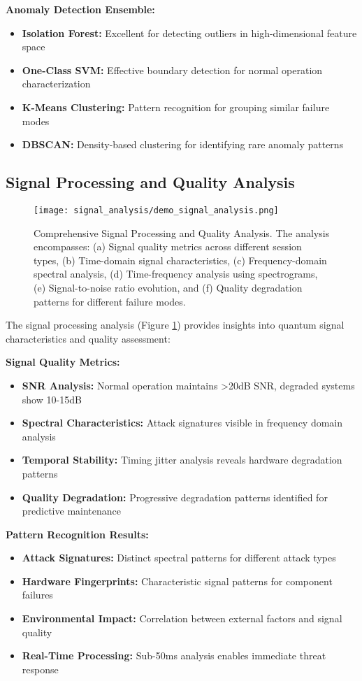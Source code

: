 \documentclass[12pt,a4paper]{article}
\begin{document}
\textbf{Anomaly Detection Ensemble:}
\begin{itemize}
    \item \textbf{Isolation Forest:} Excellent for detecting outliers in high-dimensional feature space
    \item \textbf{One-Class SVM:} Effective boundary detection for normal operation characterization
    \item \textbf{K-Means Clustering:} Pattern recognition for grouping similar failure modes
    \item \textbf{DBSCAN:} Density-based clustering for identifying rare anomaly patterns
\end{itemize}

\subsection{Signal Processing and Quality Analysis}

\begin{figure}[H]
\centering
\texttt{[image: signal\_analysis/demo\_signal\_analysis.png]}
\caption{Comprehensive Signal Processing and Quality Analysis. The analysis encompasses: (a) Signal quality metrics across different session types, (b) Time-domain signal characteristics, (c) Frequency-domain spectral analysis, (d) Time-frequency analysis using spectrograms, (e) Signal-to-noise ratio evolution, and (f) Quality degradation patterns for different failure modes.}
\label{fig:signal_analysis}
\end{figure}

The signal processing analysis (Figure \ref{fig:signal_analysis}) provides insights into quantum signal characteristics and quality assessment:

\textbf{Signal Quality Metrics:}
\begin{itemize}
    \item \textbf{SNR Analysis:} Normal operation maintains >20dB SNR, degraded systems show 10-15dB
    \item \textbf{Spectral Characteristics:} Attack signatures visible in frequency domain analysis
    \item \textbf{Temporal Stability:} Timing jitter analysis reveals hardware degradation patterns
    \item \textbf{Quality Degradation:} Progressive degradation patterns identified for predictive maintenance
\end{itemize}

\textbf{Pattern Recognition Results:}
\begin{itemize}
    \item \textbf{Attack Signatures:} Distinct spectral patterns for different attack types
    \item \textbf{Hardware Fingerprints:} Characteristic signal patterns for component failures
    \item \textbf{Environmental Impact:} Correlation between external factors and signal quality
    \item \textbf{Real-Time Processing:} Sub-50ms analysis enables immediate threat response
\end{itemize}
\end{document}
